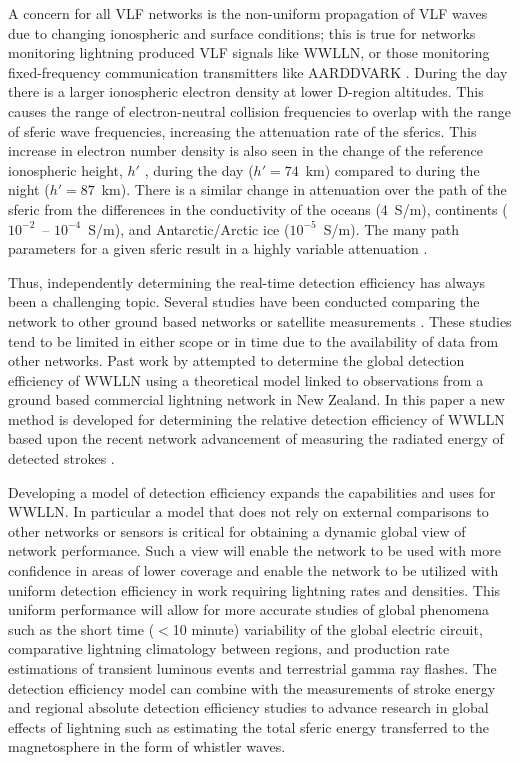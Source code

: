 A concern for all VLF networks is the non-uniform propagation of VLF waves due to changing ionospheric  and surface conditions; this is true for networks monitoring lightning produced VLF signals like WWLLN, or those monitoring fixed-frequency communication transmitters like AARDDVARK \citep{Clilverd2009}.
During the day there is a larger ionospheric electron density at lower D-region altitudes.
This causes the range of electron-neutral collision frequencies to overlap with the range of sferic wave frequencies, increasing the attenuation rate of the sferics.
This increase in electron number density is also seen in the change of the reference ionospheric height, $h'$ \citep{Wait1960a}, during the day ($h'=74$~km) compared to during the night ($h'=87$~km).
There is a similar change in attenuation over the path of the sferic from the differences in the conductivity of the oceans (4~S/m), continents ($10^{-2}$~-- $10^{-4}$~S/m), and Antarctic/Arctic ice ($10^{-5}$~S/m).
The many path parameters for a given sferic result in a highly variable attenuation \citep{Volland1995}.

Thus, independently determining the real-time detection efficiency has always been a challenging topic.
Several studies have been conducted comparing the network to other ground based networks or satellite measurements \citep{Lay2004b, Jacobson2006c, Rodger2009, Abarca2010, Abreu2010}.
These studies tend to be limited in either scope or in time due to the availability of data from other networks.
Past work by \citet{Rodger2006} attempted to determine the global detection efficiency of WWLLN using a theoretical model linked to observations from a ground based commercial lightning network in New Zealand.
In this paper a new method is developed for determining  the relative detection efficiency of WWLLN based upon the recent network advancement of measuring the radiated energy of detected strokes \citep{Hutchins2012}.

Developing a model of detection efficiency expands the capabilities and uses for WWLLN.
In particular a model that does not rely on external comparisons to other networks or sensors is critical for obtaining a dynamic global view of network performance.
Such a view will enable the network to be used with more confidence in areas of lower coverage and enable the network to be utilized with uniform detection efficiency in work requiring lightning rates and densities.
This uniform performance will allow for more accurate studies of global phenomena such as the short time ($<$10 minute) variability of the global electric circuit, comparative lightning climatology between regions, and production rate estimations of transient luminous events and terrestrial gamma ray flashes.
The detection efficiency model can combine with the measurements of stroke energy and regional absolute detection efficiency studies to advance research in global effects of lightning such as estimating the total sferic energy transferred to the magnetosphere in the form of whistler waves.

